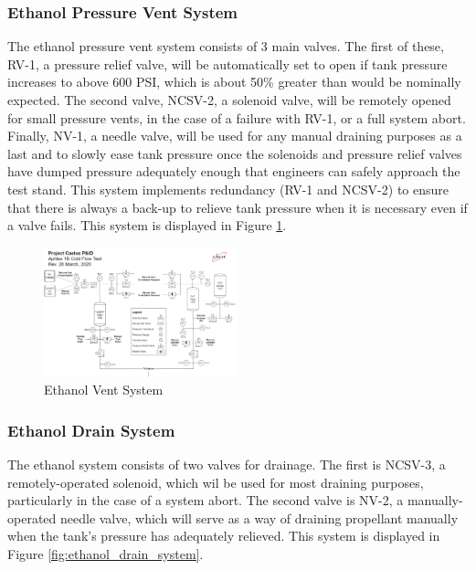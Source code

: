 \documentclass[9pt]{article} %
\numberwithin{equation}{section} %
\begin{document}
\subsubsection{Ethanol Pressure Vent System}
\hspace{\parindent} The ethanol pressure vent system consists of 3 main valves. The first of these, RV-1, a pressure relief valve, will be automatically set to open if tank pressure increases to above 600 PSI, which is about 50\% greater than would be nominally expected. The second valve, NCSV-2, a solenoid valve, will be remotely opened for small pressure vents, in the case of a failure with RV-1, or a full system abort. Finally, NV-1, a needle valve, will be used for any manual draining purposes as a last and to slowly ease tank pressure once the solenoids and pressure relief valves have dumped pressure adequately enough that engineers can safely approach the test stand. This system implements redundancy (RV-1 and NCSV-2) to ensure that there is always a back-up to relieve tank pressure when it is necessary even if a valve fails. This system is displayed in Figure \ref{fig:ethanol_vent_system}.

\begin{figure}[!htb] 
    \centering
    \includegraphics[scale=0.5, width=0.5\textwidth, trim={15cm 18cm 18.3cm 5cm}, clip]{pid} %
    \caption{Ethanol Vent System}
    \label{fig:ethanol_vent_system}
\end{figure}

\subsubsection{Ethanol Drain System}
\hspace{\parindent} The ethanol system consists of two valves for drainage. The first is NCSV-3, a remotely-operated solenoid, which wil be used for most draining purposes, particularly in the case of a system abort. The second valve is NV-2, a manually-operated needle valve, which will serve as a way of draining propellant manually when the tank's pressure has adequately relieved. This system is displayed in Figure \ref{fig:ethanol_drain_system}.
\end{document}
